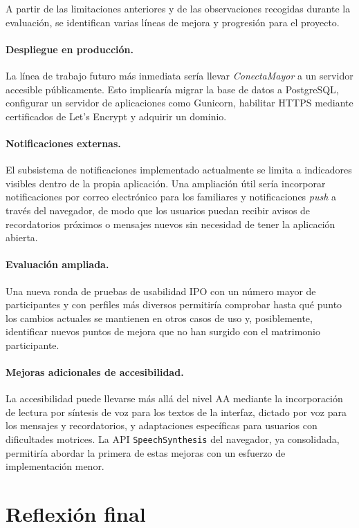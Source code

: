 A partir de las limitaciones anteriores y de las observaciones recogidas durante
la evaluación, se identifican varias líneas de mejora y progresión para el proyecto.

\paragraph{Despliegue en producción.}
La línea de trabajo futuro más inmediata sería llevar \emph{ConectaMayor} a un
servidor accesible públicamente. Esto implicaría migrar la base de datos a
PostgreSQL, configurar un servidor de aplicaciones como Gunicorn, habilitar HTTPS mediante certificados de Let's Encrypt y
adquirir un dominio.

\paragraph{Notificaciones externas.}
El subsistema de notificaciones implementado actualmente se limita a indicadores
visibles dentro de la propia aplicación. Una ampliación útil sería incorporar
notificaciones por correo electrónico para los familiares y notificaciones
\emph{push} a través del navegador, de modo que los usuarios puedan recibir
avisos de recordatorios próximos o mensajes nuevos sin necesidad de tener la
aplicación abierta.

\paragraph{Evaluación ampliada.}
Una nueva ronda de pruebas de usabilidad IPO con un número mayor de participantes y con
perfiles más diversos permitiría comprobar hasta qué punto los cambios actuales se
mantienen en otros casos de uso y, posiblemente, identificar nuevos puntos de
mejora que no han surgido con el matrimonio participante.

\paragraph{Mejoras adicionales de accesibilidad.}
La accesibilidad puede llevarse más allá del nivel AA mediante la incorporación
de lectura por síntesis de voz para los textos de la interfaz, dictado por voz
para los mensajes y recordatorios, y adaptaciones específicas para usuarios con
dificultades motrices. La API \texttt{SpeechSynthesis} del navegador, ya
consolidada, permitiría abordar la primera de estas mejoras con un esfuerzo de
implementación menor.


\section{Reflexión final\label{SEC:CONC_REFLEXION}}

